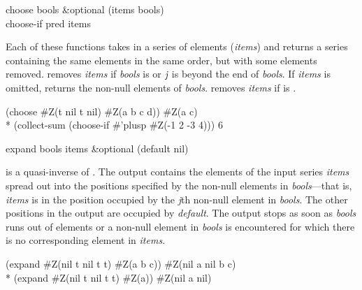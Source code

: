 \begin{defun}[Function]
choose bools &optional (items bools) \\
choose-if pred items

Each of these functions takes in a series of elements (\emph{items}) and
returns a series containing the same elements in the same order, but with
some elements removed.   removes \emph{items} if {\it
bools} is  or $\emph{j}$ is beyond the end of \emph{bools}.  If {\it
items} is omitted,  returns the non-null elements of {\it
bools}.   removes \emph{items} if 
 is .
\begin{lisp}
(choose \#Z(t nil t nil) \#Z(a b c d)) {\EV} \#Z(a c) \\*
(collect-sum (choose-if \#'plusp \#Z(-1 2 -3 4))) {\EV} 6
\end{lisp}
\end{defun}

\begin{defun}[Function]
expand bools items &optional (default nil)

 is a quasi-inverse of .  The output contains the
elements of the input series \emph{items} spread out into the positions
specified by the non-null elements
in \emph{bools}---that is, \emph{items}
is in the position occupied by the \emph{j\/}th non-null element in \emph{bools}.
The other positions in the output are occupied by \emph{default}.  The
output stops as soon as \emph{bools} runs out of elements or a non-null
element in \emph{bools} is encountered for which there is no corresponding
element in \emph{items}.
\begin{lisp}
(expand \#Z(nil t nil t t) \#Z(a b c)) {\EV} \#Z(nil a nil b c) \\*
(expand \#Z(nil t nil t t) \#Z(a)) {\EV} \#Z(nil a nil)
\end{lisp}
\end{defun}

